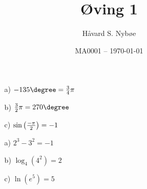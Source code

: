 \documentclass[a4paper, 12pt]{article}  %
\title{Øving 1}                         %
\date{MA0001 -- \today}                 %
\author{Håvard S. Nybøe}           %
\begin{document}
\maketitle

\begin{enumerate}
    \item[\boxed{1}] 
    \begin{enumerate}
        \item[a)] $-135\degree = {\frac{3}{4}} \pi$
        \item[b)] $\frac{3}{2}\pi = 270\degree$
        \item[c)] $\sin\left(-\pi \over 2\right) = -1$
    \end{enumerate}
    \item[\boxed{2}]
    \begin{enumerate}
        \item[a)] $2^{3} - 3^{2} = -1$
        \item[b)] $\log_{4}(4^2) = 2$
        \item[c)] $\ln(e^5) = 5$
    \end{enumerate} 
\end{enumerate}

\end{document}
